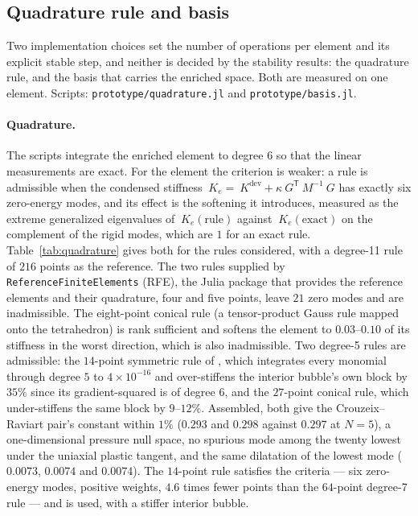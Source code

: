 \documentclass[11pt]{article}
\newcommand{\transpose}[1]{#1^{\mathsf{T}}}
\newcommand{\supdev}{^{\mathrm{dev}}}
\newcommand{\code}[1]{\texttt{#1}}
\theoremstyle{definition}
\theoremstyle{plain}
\begin{document}
\subsection{Quadrature rule and basis}
\label{sec:basis}

Two implementation choices set the number of operations per element and its
explicit stable step, and neither is decided by the stability results: the
quadrature rule, and the basis that carries the enriched space. Both are
measured on one element. Scripts:
\code{prototype/quadrature.jl} and \code{prototype/basis.jl}.

\paragraph{Quadrature.} The scripts integrate the enriched element to degree
$6$ so that the linear measurements are exact. For the element the criterion
is weaker: a rule is admissible when the condensed stiffness
$~K_e = ~K\supdev + \kappa\transpose{~G}~M^{-1}~G$ has exactly six
zero-energy modes, and its effect is the softening it introduces, measured as
the extreme generalized eigenvalues of $~K_e(\text{rule})$ against
$~K_e(\text{exact})$ on the complement of the rigid modes, which are $1$ for
an exact rule. Table~\ref{tab:quadrature} gives both for the rules
considered, with a degree-11 rule of $216$ points as the reference. The two
rules supplied by \code{ReferenceFiniteElements} (RFE), the Julia package that
provides the reference elements and their quadrature, four and five points,
leave
$21$ zero modes and are inadmissible. The eight-point conical rule (a
tensor-product Gauss rule mapped onto the tetrahedron) is rank sufficient and softens the element to $0.03$--$0.10$ of its stiffness in
the worst direction, which is also inadmissible. Two degree-5 rules are
admissible: the $14$-point symmetric rule of \citet{Keast:1986}, which
integrates every monomial through degree $5$ to $4\times10^{-16}$ and
over-stiffens the interior bubble's own block by $35\%$ since its
gradient-squared is of degree $6$, and the $27$-point conical rule, which
under-stiffens the same block by $9$--$12\%$. Assembled, both give the
Crouzeix--Raviart pair's constant within $1\%$ ($0.293$ and $0.298$ against
$0.297$ at $N = 5$), a one-dimensional pressure null space, no spurious mode
among the twenty lowest under the uniaxial plastic tangent, and the same
dilatation of the lowest mode ($0.0073$, $0.0074$ and $0.0074$). The
$14$-point rule satisfies the criteria --- six zero-energy modes, positive
weights, $4.6$ times fewer points than the $64$-point degree-7 rule --- and
is used, with a stiffer interior bubble.
\end{document}
